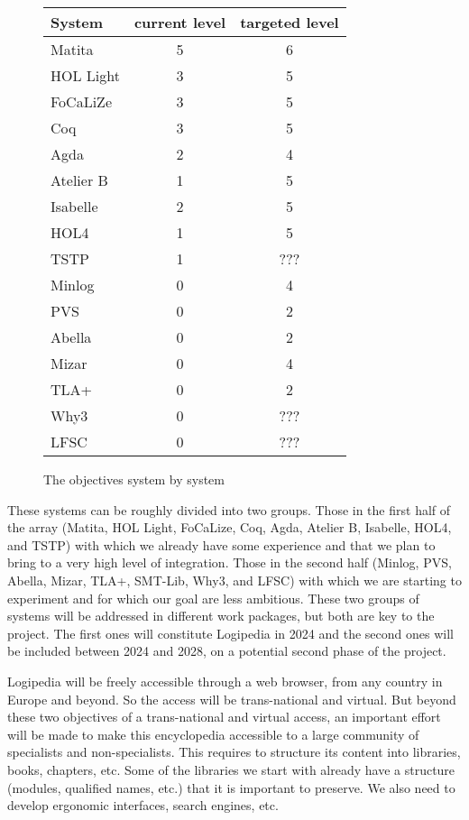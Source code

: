 \begin{figure}[t]
\begin{center}
\begin{tabular}{|l|c|c|}
\hline
System & current level & targeted level\\
\hline
{\sf Matita} & 5 & 6\\
\hline
{\sf HOL Light} & 3 & 5\\
\hline
{\sf FoCaLiZe} & 3 & 5\\
\hline
{\sf Coq} & 3 & 5\\
\hline
{\sf Agda} & 2 & 4\\
\hline
{\sf Atelier B} & 1 & 5\\
\hline
{\sf Isabelle} & 2 & 5\\
\hline
{\sf HOL4} & 1 & 5\\
\hline
{\sf TSTP} & 1 & {\color{red} ???}\\
\hline
{\sf Minlog} & 0 & 4\\
\hline
{\sf PVS} & 0 & 2\\
\hline
{\sf Abella} & 0 & 2\\
\hline
{\sf Mizar} & 0 & 4\\
\hline
{\sf TLA+} & 0 & 2\\
\hline
{\sf Why3} & 0 & {\color{red} ???}\\
\hline
{\sf LFSC} & 0 & {\color{red} ???}\\
\hline
\end{tabular}
\end{center}
\caption{The objectives system by system \label{objectives}}
\end{figure}

These systems can be roughly divided into two groups. Those in the
first half of the array ({\sf Matita}, {\sf HOL Light}, {\sf
  FoCaLize}, {\sf Coq}, {\sf Agda}, {\sf Atelier B}, {\sf Isabelle},
{\sf HOL4}, and {\sf TSTP}) with which we already have some experience
and that we plan to bring to a very high level of integration. Those
in the second half ({\sf Minlog}, {\sf PVS}, {\sf Abella}, {\sf
  Mizar}, {\sf TLA+}, {\sf SMT-Lib}, {\sf Why3}, and {\sf LFSC}) with
which we are starting to experiment and for which our goal are less
ambitious.  These two groups of systems will be addressed in different
work packages, but both are key to the project. The first ones will
constitute {\sf Logipedia} in 2024 and the second ones will be
included between 2024 and 2028, on a potential second phase of the
project.

{\sf Logipedia} will be freely accessible through a web browser, from
any country in Europe and beyond. So the access will be trans-national
and virtual. But beyond these two objectives of a trans-national and
virtual access, an important effort will be made to make this
encyclopedia accessible to a large community of specialists and
non-specialists. This requires to structure its content into
libraries, books, chapters, etc. Some of the libraries we start with
already have a structure (modules, qualified names, etc.) that it is
important to preserve. We also need to develop ergonomic interfaces,
search engines, etc.

